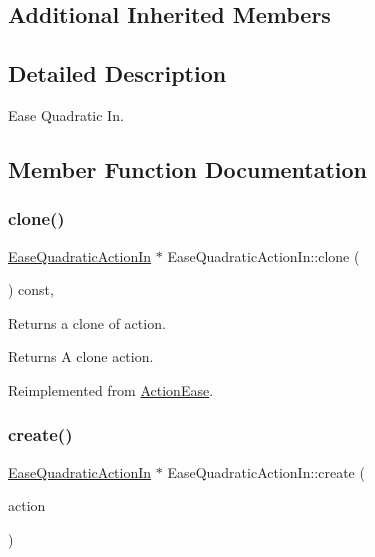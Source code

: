 \subsection*{Additional Inherited Members}


\subsection{Detailed Description}
Ease Quadratic In. 

\subsection{Member Function Documentation}
\mbox{\label{classEaseQuadraticActionIn_a2e61f6edb0accd7573d55784d1ca508a}} 
\subsubsection{\texorpdfstring{clone()}{clone()}}
{\footnotesize\ttfamily \hyperlink{classEaseQuadraticActionIn}{Ease\+Quadratic\+Action\+In} $\ast$ Ease\+Quadratic\+Action\+In\+::clone (\begin{DoxyParamCaption}\item[{void}]{ }\end{DoxyParamCaption}) const\hspace{0.3cm}{\ttfamily [override]}, {\ttfamily [virtual]}}

Returns a clone of action.

\begin{DoxyReturn}{Returns}
A clone action. 
\end{DoxyReturn}


Reimplemented from \hyperlink{classActionEase_a39bec93fe161fb732a74d8e51a2fe08b}{Action\+Ease}.

\mbox{\label{classEaseQuadraticActionIn_a08692641f85cdd99f21d2d9286522f2b}} 
\subsubsection{\texorpdfstring{create()}{create()}}
{\footnotesize\ttfamily \hyperlink{classEaseQuadraticActionIn}{Ease\+Quadratic\+Action\+In} $\ast$ Ease\+Quadratic\+Action\+In\+::create (\begin{DoxyParamCaption}\item[{\hyperlink{classActionInterval}{Action\+Interval} $\ast$}]{action }\end{DoxyParamCaption})\hspace{0.3cm}{\ttfamily [static]}}



